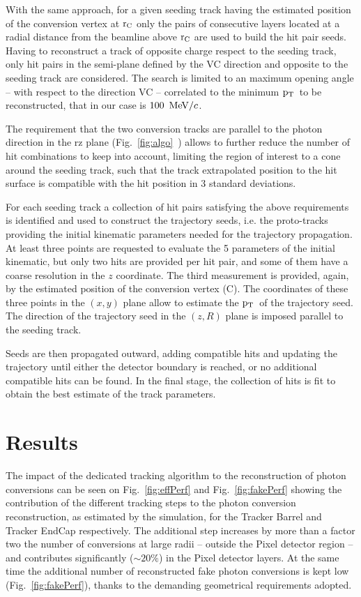 \documentclass[a4paper]{jpconf}
\def \pt{$\p_{\rm T}$~}
\begin{document}
With the same approach, for a given seeding track  having  the estimated position of the conversion vertex at  $\rm r_C$ only the pairs of consecutive layers located at a radial distance from the beamline above $\rm r_C$ are used to build the hit pair seeds. 
%
Having to reconstruct a track of opposite charge respect to the seeding track, only hit pairs in the semi-plane defined by the VC direction and opposite to the seeding track are considered. The search is limited to an maximum opening angle -- with respect to the direction VC -- correlated to the minimum \pt to be reconstructed, that in our case is $100~{\rm \, MeV}/c$.

The requirement that the two conversion tracks are parallel to the photon direction in the rz plane (Fig.~\ref{fig:algo}~) allows to further   reduce the number of hit combinations to keep into account, limiting the region of interest to a cone around the seeding track, such that the track extrapolated position to the hit surface is compatible with the hit position in 3 standard deviations.  


For each seeding track a collection of hit pairs satisfying the above requirements  is identified and used to construct the trajectory seeds, i.e. the proto-tracks providing the initial kinematic parameters needed for the trajectory propagation.
At least three points are requested to evaluate the 5 parameters of the initial kinematic, but only two hits are provided per hit pair, and some of them have a coarse resolution in the $z$ coordinate. The third measurement is provided, again, by the   estimated position of the conversion vertex (C). The coordinates of these three points in the $(x,y)$ plane allow to estimate the \pt of the trajectory seed. The direction of the trajectory seed in the $(z,R)$ plane is imposed parallel to the seeding track.

Seeds are then
propagated outward, adding compatible hits and updating the trajectory
until either the detector boundary is reached, or no additional
compatible hits can be found.  In the final stage, the collection of
hits is fit to obtain the best estimate of the track parameters.

\section{Results}

The impact of the dedicated tracking algorithm  to the reconstruction of photon conversions
 can be seen on Fig.~\ref{fig:effPerf} and Fig.~\ref{fig:fakePerf} 
showing the contribution of the different tracking steps to the photon conversion
reconstruction, as estimated by the simulation, for the Tracker Barrel and Tracker EndCap respectively.
The additional step increases by more than a factor two the number of conversions at large radii -- outside the Pixel detector region -- and contributes significantly ($\sim 20\%$) in the Pixel detector layers.
 At the same time the additional number of reconstructed fake photon conversions is kept low (Fig.~\ref{fig:fakePerf}), thanks to the demanding geometrical requirements adopted.
 
\end{document}
